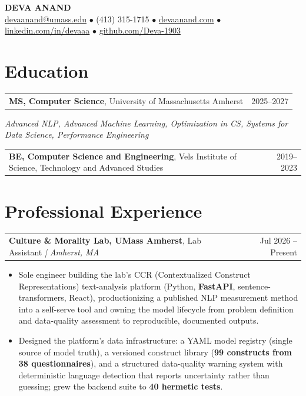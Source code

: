 \documentclass[letterpaper,11pt]{article}
\makeatletter
\newcommand{\eduItem}[3]{%
  \begin{tabular*}{\textwidth}{@{}l@{\extracolsep{\fill}}r@{}}
    \textbf{#1}, #2 & #3 \\
  \end{tabular*}\par
}
\newcommand{\expItem}[4]{%
  \vspace{2pt}
  \begin{tabular*}{\textwidth}{@{}l@{\extracolsep{\fill}}r@{}}
    \textbf{#1}, #2 \textit{| #3} & #4 \\
  \end{tabular*}\par\vspace{-3pt}
}
\makeatother
\begin{document}
\begin{center}
    {\fontsize{18}{20}\selectfont\bfseries DEVA ANAND}\\ \vspace{3pt}
    {\small
    \href{mailto:devaanand@umass.edu}{devaanand@umass.edu}
    \enspace$\bullet$\enspace
    (413) 315-1715
    \enspace$\bullet$\enspace
    \href{https://devaanand.com}{devaanand.com}
    \enspace$\bullet$\enspace
    \href{https://linkedin.com/in/devaaa/}{linkedin.com/in/devaaa}
    \enspace$\bullet$\enspace
    \href{https://github.com/Deva-1903}{github.com/Deva-1903}}
\end{center}
\vspace{-8pt}

\section{Education}
\eduItem{MS, Computer Science}{University of Massachusetts Amherst}{2025--2027}
{\small\textit{Advanced NLP, Advanced Machine Learning, Optimization in CS, Systems for Data Science, Performance Engineering}}\par
\vspace{3pt}
\eduItem{BE, Computer Science and Engineering}{Vels Institute of Science, Technology and Advanced Studies}{2019--2023}

\section{Professional Experience}

\expItem{Culture \& Morality Lab, UMass Amherst}{Lab Assistant}{Amherst, MA}{Jul 2026 -- Present}
\begin{itemize}
  \item Sole engineer building the lab's CCR (Contextualized Construct Representations) text-analysis platform (Python, \textbf{FastAPI}, sentence-transformers, React), productionizing a published NLP measurement method into a self-serve tool and owning the model lifecycle from problem definition and data-quality assessment to reproducible, documented outputs.
  \item Designed the platform's data infrastructure: a YAML model registry (single source of model truth), a versioned construct library (\textbf{99 constructs from 38 questionnaires}), and a structured data-quality warning system with deterministic language detection that reports uncertainty rather than guessing; grew the backend suite to \textbf{40 hermetic tests}.
\end{itemize}
\end{document}
